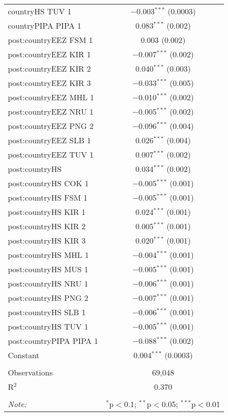\documentclass[12pt,]{article}
\begin{document}
\begin{table}[!htbp]
\begin{tabular}{@{\extracolsep{5pt}}lc}
  countryHS TUV 1 & $-$0.003$^{***}$ (0.0003) \\ 
  countryPIPA PIPA 1 & 0.083$^{***}$ (0.002) \\ 
  post:countryEEZ FSM 1 & 0.003 (0.002) \\ 
  post:countryEEZ KIR 1 & $-$0.007$^{***}$ (0.002) \\ 
  post:countryEEZ KIR 2 & 0.040$^{***}$ (0.003) \\ 
  post:countryEEZ KIR 3 & $-$0.033$^{***}$ (0.005) \\ 
  post:countryEEZ MHL 1 & $-$0.010$^{***}$ (0.002) \\ 
  post:countryEEZ NRU 1 & $-$0.005$^{***}$ (0.002) \\ 
  post:countryEEZ PNG 2 & $-$0.096$^{***}$ (0.004) \\ 
  post:countryEEZ SLB 1 & 0.026$^{***}$ (0.004) \\ 
  post:countryEEZ TUV 1 & 0.007$^{***}$ (0.002) \\ 
  post:countryHS & 0.034$^{***}$ (0.002) \\ 
  post:countryHS COK 1 & $-$0.005$^{***}$ (0.001) \\ 
  post:countryHS FSM 1 & $-$0.005$^{***}$ (0.001) \\ 
  post:countryHS KIR 1 & 0.024$^{***}$ (0.001) \\ 
  post:countryHS KIR 2 & 0.005$^{***}$ (0.001) \\ 
  post:countryHS KIR 3 & 0.020$^{***}$ (0.001) \\ 
  post:countryHS MHL 1 & $-$0.004$^{***}$ (0.001) \\ 
  post:countryHS MUS 1 & $-$0.005$^{***}$ (0.001) \\ 
  post:countryHS NRU 1 & $-$0.006$^{***}$ (0.001) \\ 
  post:countryHS PNG 2 & $-$0.007$^{***}$ (0.001) \\ 
  post:countryHS SLB 1 & $-$0.006$^{***}$ (0.001) \\ 
  post:countryHS TUV 1 & $-$0.005$^{***}$ (0.001) \\ 
  post:countryPIPA PIPA 1 & $-$0.088$^{***}$ (0.002) \\ 
  Constant & 0.004$^{***}$ (0.0003) \\ 
 \hline \\[-1.8ex] 
Observations & 69,048 \\ 
R$^{2}$ & 0.370 \\ 
\hline 
\hline \\[-1.8ex] 
\textit{Note:}  & \multicolumn{1}{r}{$^{*}$p$<$0.1; $^{**}$p$<$0.05; $^{***}$p$<$0.01} \\ 
\end{tabular} 
\end{table}
\end{document}
